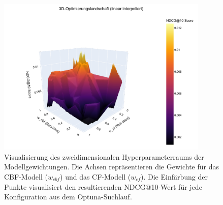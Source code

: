
\begin{figure}[htbp]
    \centering
    \includegraphics[width=0.9\textwidth]{content/figures/svg/hyperparameterraum.pdf}
    \caption{Visualisierung des zweidimensionalen Hyperparameterraums der Modellgewichtungen. Die Achsen repräsentieren die Gewichte für das CBF-Modell (\(w_{cbf}\)) und das CF-Modell (\(w_{cf}\)). Die Einfärbung der Punkte visualisiert den resultierenden NDCG@10-Wert für jede Konfiguration aus dem Optuna-Suchlauf.}
    \label{fig:hyperparameterraum}
\end{figure}